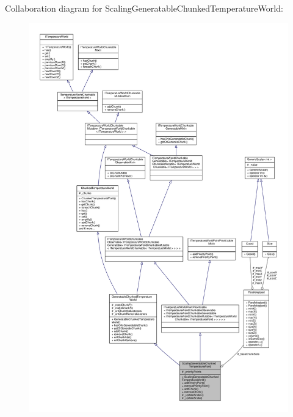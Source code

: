 Collaboration diagram for Scaling\-Generatable\-Chunked\-Temperature\-World\-:
\nopagebreak
\begin{figure}[H]
\begin{center}
\leavevmode
\includegraphics[width=350pt]{class_scaling_generatable_chunked_temperature_world__coll__graph}
\end{center}
\end{figure}
